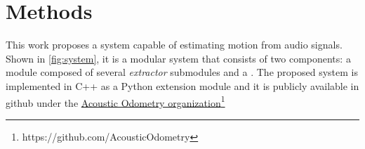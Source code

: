 \section{Methods} \label{sec:methods}

This work proposes a system capable of estimating motion from audio signals.
Shown in \cref{fig:system}, it is a modular system that consists of two
components: a  module composed of several
\emph{extractor} submodules and a . The
proposed system is implemented in C++ as a Python extension module and it is
publicly available in github under the
\href{https://github.com/AcousticOdometry}{Acoustic Odometry
organization}\footnote{https://github.com/AcousticOdometry}




